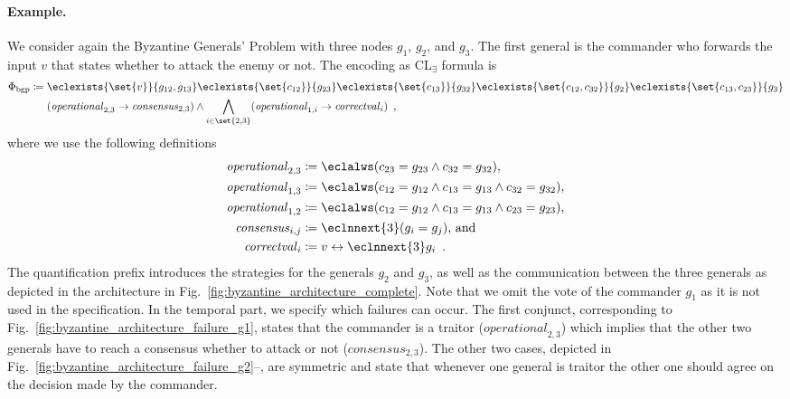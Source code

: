 \documentclass{LMCS}
\newcommand{\operational}{\mathit{operational}}
\newcommand{\consensus}{\mathit{consensus}}
\newcommand{\correctval}{\mathit{correctval}}
\theoremstyle{plain}\newtheorem{theorem}[thm]{Theorem}
\theoremstyle{plain}\newtheorem{lemma}[thm]{Lemma}
\theoremstyle{plain}\newtheorem{proposition}[thm]{Proposition}
\theoremstyle{plain}\newtheorem{corollary}[thm]{Corollary}
\theoremstyle{definition}\newtheorem{definition}{Definition}[section]
\begin{document}
\paragraph{\bf Example.} \label{sec:qptl_translation_example}
We consider again the Byzantine Generals' Problem with three nodes $g_1$, $g_2$, and $g_3$.
The first general is the commander who forwards the input $v$ that states whether to attack the enemy or not.
The encoding as CL$_\exists$ formula is
\begin{align} \label{eq:byzantine_generals}
  \Phi_{\text{bgp}} \coloneqq {}
  &\eclexists{\set{v}}{g_{12}, g_{13}}
  \eclexists{\set{c_{12}}}{g_{23}} 
  \eclexists{\set{c_{13}}}{g_{32}} \eclexists{\set{c_{12},c_{32}}}{g_2}
  \eclexists{\set{c_{13},c_{23}}}{g_3} \nonumber \\
  &(\operational_{2,3} \rightarrow \consensus_{2,3}) \land \bigwedge_{i \in \set{2,3}} (\operational_{1,i} \rightarrow \correctval_i) \enspace ,
\end{align}\noindent
where we use the following definitions
\begin{align*}
  \operational_{2,3} \coloneqq{}& \eclalws (c_{23} = g_{23} \land c_{32} = g_{32}) , \\
  \operational_{1,3} \coloneqq{}& \eclalws (c_{12} = g_{12} \land c_{13} = g_{13} \land c_{32} = g_{32}) , \\
  \operational_{1,2} \coloneqq{}& \eclalws (c_{12} = g_{12} \land c_{13} = g_{13} \land c_{23} = g_{23}) , \\
\consensus_{i,j} \coloneqq{}& \eclnnext{3} (g_i = g_j) \mbox{, and} \\
\correctval_i \coloneqq{}& v \leftrightarrow \eclnnext{3} g_i \enspace .
\end{align*}
The quantification prefix introduces the strategies for the generals $g_2$ and $g_3$, as well as the communication between the three generals as depicted in the architecture in Fig.~\ref{fig:byzantine_architecture_complete}.
Note that we omit the vote of the commander $g_1$ as it is not used in the specification.
In the temporal part, we specify which failures can occur.
The first conjunct, corresponding to Fig.~\ref{fig:byzantine_architecture_failure_g1}, states that the commander is a traitor ($\operational_{2,3}$) which implies that the other two generals have to reach a consensus whether to attack or not ($\consensus_{2,3}$).
The other two cases, depicted in Fig.~\ref{fig:byzantine_architecture_failure_g2}--, are symmetric and state that whenever one general is traitor the other one should agree on the decision made by the commander.
\end{document}
